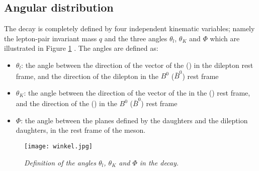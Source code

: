 \subsection{Angular distribution}
\label{sec:angles}
The \BdKstll decay is completely defined by four independent kinematic variables; namely the lepton-pair invariant mass $q$ and the three angles $\theta_l$, $\theta_K$ and $\Phi$ which are illustrated in Figure \ref{fig:winkel} \cite{krueger} \cite{ananote}. The angles are defined as:
\begin{itemize}
\item $\theta_l$: the angle between the direction of the vector of the \en (\ep) in the dilepton rest frame, and the direction of the dilepton in the $B^0$ ($\bar{B}^0$) rest frame
\item $\theta_K$: the angle between the direction of the vector of the \pion in the \Kstarz (\Kstarzb) rest frame, and the direction of the \Kstarz (\Kstarzb) in the $B^0$ ($\bar{B}^0$) rest frame
\item $\Phi$: the angle between the planes defined by the \Kstarz daughters and the dileption daughters, in the rest frame of the \B meson.
\end{itemize}

\begin{figure}[!h]
  \begin{center}
  	\vspace*{-0.5cm}
 \texttt{[image: winkel.jpg]}
  \vspace*{-0.8cm}
  \end{center}
  \caption{\textit{Definition of the angles $\theta_l$, $\theta_K$ and $\Phi$ in the \BdKstll decay.}}
  \label{fig:winkel}
\end{figure}

